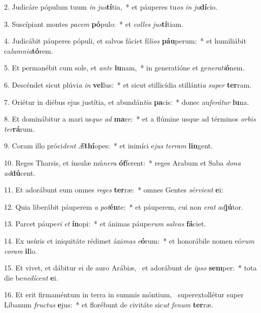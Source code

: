 2. Judicáre pópulum tuum \textit{in} \textit{jus}\textbf{tí}tia,~*  et páuperes tu\textit{os} \textit{in} \textit{ju}\textbf{dí}cio.\

3. Suscípiant montes \textit{pa}\textit{cem} \textbf{pó}pulo:~*  et \textit{col}\textit{les} \textit{jus}\textbf{tí}tiam.\

4. Judicábit páuperes pópuli, et salvos fáciet fí\textit{li}\textit{os} \textbf{páu}perum:~*  et humiliábit ca\textit{lum}\textit{ni}\textit{a}\textbf{tó}rem.\

5. Et permanébit cum sole, et \textit{an}\textit{te} \textbf{lu}nam,~*  in generatióne et ge\textit{ne}\textit{ra}\textit{ti}\textbf{ó}nem.\

6. Descéndet sicut plúvi\textit{a} \textit{in} \textbf{vel}lus:~*  et sicut stillicídia stillánti\textit{a} \textit{su}\textit{per} \textbf{ter}ram.\

7. Oriétur in diébus ejus justítia, et abundán\textit{ti}\textit{a} \textbf{pa}cis:~*  donec au\textit{fe}\textit{rá}\textit{tur} \textbf{lu}na.\

8. Et dominábitur a mari us\textit{que} \textit{ad} \textbf{ma}re:~*  et a flúmine usque ad términos \textit{or}\textit{bis} \textit{ter}\textbf{rá}rum.\

9. Coram illo próci\textit{dent} \textit{Æ}\textbf{thí}opes:~*  et inimíci e\textit{jus} \textit{ter}\textit{ram} \textbf{lin}gent.\

10. Reges Tharsis, et ínsulæ mú\textit{ne}\textit{ra} \textbf{óf}ferent:~*  reges Arabum et Saba \textit{do}\textit{na} \textit{ad}\textbf{dú}cent.\

11. Et adorábunt eum omnes \textit{re}\textit{ges} \textbf{ter}ræ:~*  omnes Gentes \textit{sér}\textit{vi}\textit{ent} \textbf{e}i:\

12. Quia liberábit páuperem \textit{a} \textit{pot}\textbf{én}te:~*  et páuperem, cui non \textit{e}\textit{rat} \textit{ad}\textbf{jú}tor.\

13. Parcet páupe\textit{ri} \textit{et} \textbf{ín}opi:~*  et ánimas páupe\textit{rum} \textit{sal}\textit{vas} \textbf{fá}ciet.\

14. Ex usúris et iniquitáte rédimet áni\textit{mas} \textit{e}\textbf{ó}rum:~*  et honorábile nomen eó\textit{rum} \textit{co}\textit{ram} \textbf{il}lo.\

15. Et vivet, et dábitur ei de auro Arábiæ, \dag\  et adorábunt de \textit{ip}\textit{so} \textbf{sem}per:~*  tota die be\textit{ne}\textit{dí}\textit{cent} \textbf{e}i.\

16. Et erit firmaméntum in terra in summis móntium, \dag\  superextollétur super Líbanum \textit{fruc}\textit{tus} \textbf{e}jus:~*  et florébunt de civitáte sic\textit{ut} \textit{fe}\textit{num} \textbf{ter}ræ.\

